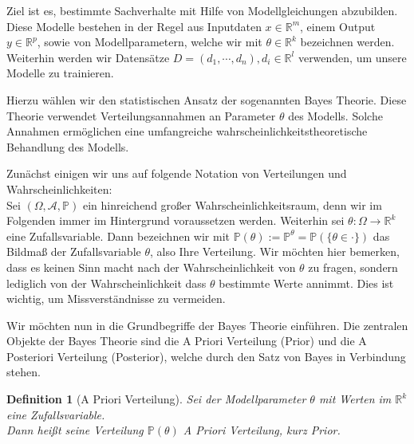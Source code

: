 \documentclass{report}
\theoremstyle{linebreak}
\newtheorem{defi}{Definition}%
\begin{document}

Ziel ist es, bestimmte Sachverhalte mit Hilfe von Modellgleichungen abzubilden. Diese Modelle bestehen in der Regel aus Inputdaten $x \in \mathbb{R}^m$, einem Output $y \in \mathbb{R}^p$, sowie von Modellparametern, welche wir mit $\theta \in \mathbb{R}^k$ bezeichnen werden. Weiterhin werden wir Datensätze $D = (d_1, \cdots, d_n), d_i \in \mathbb{R}^l$ verwenden, um unsere Modelle zu trainieren. 


Hierzu wählen wir den statistischen Ansatz der sogenannten Bayes Theorie. Diese Theorie verwendet Verteilungsannahmen an Parameter $\theta$ des Modells. Solche Annahmen ermöglichen eine umfangreiche wahrscheinlichkeitstheoretische Behandlung des Modells.

Zunächst einigen wir uns auf folgende Notation von Verteilungen und Wahrscheinlichkeiten: \\
Sei $(\Omega, \mathcal{A}, \mathbb{P})$ ein hinreichend großer Wahrscheinlichkeitsraum, denn wir im Folgenden immer im Hintergrund voraussetzen werden. Weiterhin sei $\theta: \Omega \rightarrow \mathbb{R}^k$ eine Zufallsvariable. Dann bezeichnen wir mit
$\mathbb{P}(\theta) := \mathbb{P}^\theta = \mathbb{P}(\{ \theta \in \cdot \})$
das Bildmaß der Zufallsvariable $\theta$, also Ihre Verteilung.
Wir möchten hier bemerken, dass es keinen Sinn macht nach der Wahrscheinlichkeit von $\theta$ zu fragen, sondern lediglich von der Wahrscheinlichkeit dass $\theta$ bestimmte Werte annimmt. Dies ist wichtig, um Missverständnisse zu vermeiden.

Wir möchten nun in die Grundbegriffe der Bayes Theorie einführen. 
Die zentralen Objekte der Bayes Theorie sind die A Priori Verteilung (Prior) und die A Posteriori Verteilung (Posterior), welche durch den Satz von Bayes in Verbindung stehen. 

\begin{defi}[A Priori Verteilung]
	Sei der Modellparameter $\theta$ mit Werten im $\mathbb{R}^k$ eine Zufallsvariable. 		\\
	Dann heißt seine Verteilung $\mathbb{P}(\theta)$ \textit{A Priori Verteilung}, kurz 		\textit{Prior}. 
\end{defi}
\end{document}
